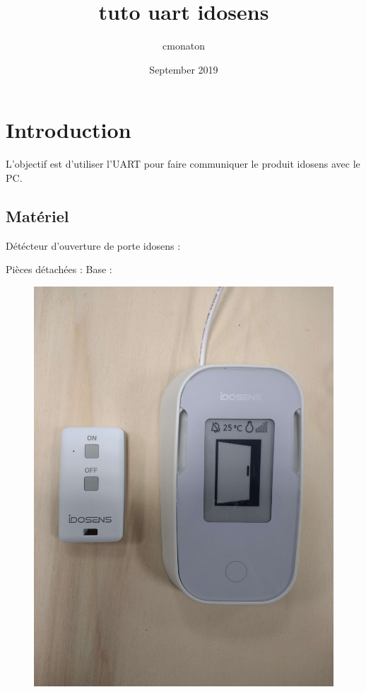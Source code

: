 \documentclass{article}
\title{tuto uart idosens}
\author{cmonaton }
\date{September 2019}
\begin{document}
\maketitle

\section{Introduction}
L'objectif est d'utiliser l'UART pour faire communiquer le produit idosens avec le PC.

\subsection{Matériel}
Détécteur d'ouverture de porte idosens :


Pièces détachées :
Base :








\begin{figure}[H]
\begin{center}
\advance\leftskip-3cm
\advance\rightskip-3cm
\includegraphics[keepaspectratio=true,scale=0.05]{produit_complet.jpg}
\label{visina8}
\end{center}\end{figure}
\end{document}
